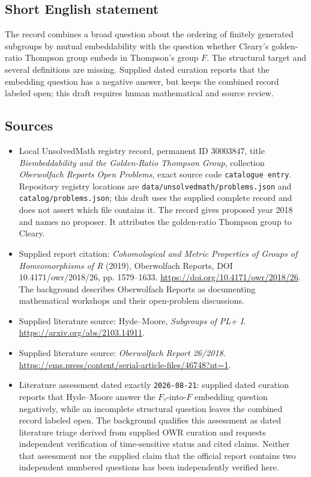 \documentclass[11pt]{article}
\begin{document}
\subsection{Short English statement}
The record combines a broad question about the ordering of finitely generated subgroups by mutual embeddability with the question whether Cleary's golden-ratio Thompson group embeds in Thompson's group \(F\). The structural target and several definitions are missing. Supplied dated curation reports that the embedding question has a negative answer, but keeps the combined record labeled open; this draft requires human mathematical and source review.
\subsection{Sources}
\begin{itemize}
\item Local UnsolvedMath registry record, permanent ID \(30003847\), title \emph{Biembeddability and the Golden-Ratio Thompson Group}, collection \emph{Oberwolfach Reports Open Problems}, exact source code \texttt{catalogue entry}. Repository registry locations are \texttt{data/unsolvedmath/problems.json} and \texttt{catalog/problems.json}; this draft uses the supplied complete record and does not assert which file contains it. The record gives proposed year 2018 and names no proposer. It attributes the golden-ratio Thompson group to Cleary.
\item Supplied report citation: \emph{Cohomological and Metric Properties of Groups of Homeomorphisms of R} (2019), Oberwolfach Reports, DOI 10.4171/owr/2018/26, pp. 1579--1633. \url{https://doi.org/10.4171/owr/2018/26}. The background describes Oberwolfach Reports as documenting mathematical workshops and their open-problem discussions.
\item Supplied literature source: Hyde--Moore, \emph{Subgroups of PL+ I}. \url{https://arxiv.org/abs/2103.14911}.
\item Supplied literature source: \emph{Oberwolfach Report 26/2018}. \url{https://ems.press/content/serial-article-files/46748?nt=1}.
\item Literature assessment dated exactly \texttt{2026-08-21}: supplied dated curation reports that Hyde--Moore answer the \(F_{\tau}\)-into-\(F\) embedding question negatively, while an incomplete structural question leaves the combined record labeled open. The background qualifies this assessment as dated literature triage derived from supplied OWR curation and requests independent verification of time-sensitive status and cited claims. Neither that assessment nor the supplied claim that the official report contains two independent numbered questions has been independently verified here.
\end{itemize}
\end{document}
